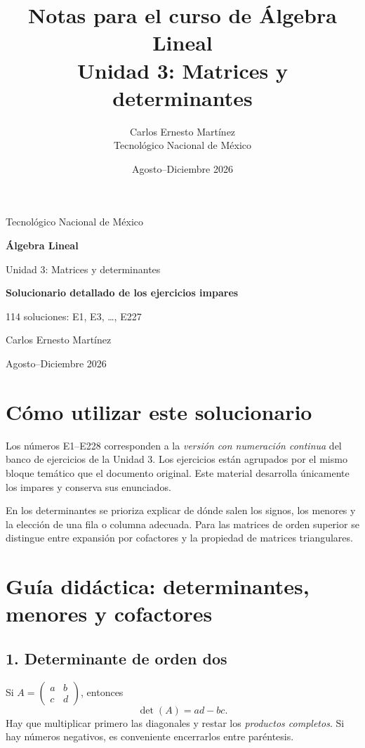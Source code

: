 \documentclass[12pt]{article}
\title{\textbf{Notas para el curso de Álgebra Lineal}\\[0.35cm]
\Large Unidad 3: Matrices y determinantes}
\author{Carlos Ernesto Martínez\\Tecnológico Nacional de México}
\date{Agosto--Diciembre 2026}
\theoremstyle{remark}
\begin{document}
\begin{titlepage}
\centering
{\large Tecnológico Nacional de México\par}
\vspace{1.3cm}
{\Huge\bfseries Álgebra Lineal\par}
\vspace{0.5cm}
{\LARGE Unidad 3: Matrices y determinantes\par}
\vspace{0.8cm}
{\Large\color{azul}\bfseries Solucionario detallado de los ejercicios impares\par}
\vspace{1cm}
{\large 114 soluciones: E1, E3, \ldots, E227\par}
\vfill
{\large Carlos Ernesto Martínez\par}
{\normalsize Agosto--Diciembre 2026\par}
\end{titlepage}
\tableofcontents
\newpage
\section*{Cómo utilizar este solucionario}
Los números E1--E228 corresponden a la \emph{versión con numeración continua} del banco de ejercicios de la Unidad 3.
Los ejercicios están agrupados por el mismo bloque temático que el documento original.
Este material desarrolla únicamente los impares y conserva sus enunciados.
\par
En los determinantes se prioriza explicar de dónde salen los signos, los menores y la elección de una fila o columna adecuada. Para las matrices de orden superior se distingue entre expansión por cofactores y la propiedad de matrices triangulares.
\section*{Guía didáctica: determinantes, menores y cofactores}
\subsection*{1. Determinante de orden dos}
Si $A=\begin{pmatrix}a&b\\c&d\end{pmatrix}$, entonces
\[\boxed{\det(A)=ad-bc}.\]
Hay que multiplicar primero las diagonales y restar los \emph{productos completos}. Si hay números negativos, es conveniente encerrarlos entre paréntesis.
\end{document}
